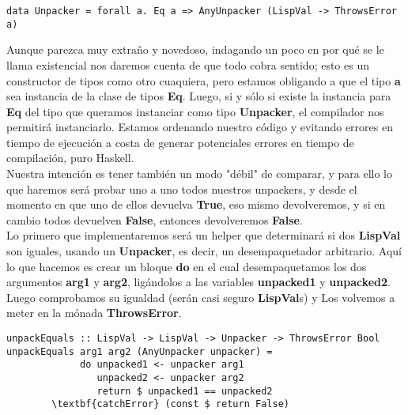\begin{minipage}{\linewidth}
\begin{scriptsize}
\begin{lstlisting}[frame=single]
data Unpacker = forall a. Eq a => AnyUnpacker (LispVal -> ThrowsError a)
\end{lstlisting}
\end{scriptsize}
\end{minipage}

Aunque parezca muy extra\~{n}o y novedoso, indagando un poco en por qu\'e se le llama existencial nos daremos cuenta de que todo cobra sentido; esto es un constructor de tipos como otro cuaquiera, pero estamos obligando a que el tipo \textbf{a} sea instancia de la clase de tipos \textbf{Eq}. Luego, si y s\'olo si existe la instancia para \textbf{Eq} del tipo que queramos instanciar como tipo \textbf{Unpacker}, el compilador nos permitir\'a instanciarlo. Estamos ordenando nuestro c\'odigo y evitando errores en tiempo de ejecuci\'on a costa de generar potenciales errores en tiempo de compilaci\'on, puro Haskell.\\

Nuestra intenci\'on es tener tambi\'en un modo "d\'ebil" de comparar, y para ello lo que haremos ser\'a probar uno a uno todos nuestros unpackers, y desde el momento en que uno de ellos devuelva \textbf{True}, eso mismo devolveremos, y si en cambio todos devuelven \textbf{False}, entonces devolveremos \textbf{False}.\\

Lo primero que implementaremos ser\'a un helper que determinar\'a si dos \textbf{LispVal} son iguales, usando un \textbf{Unpacker}, es decir, un desempaquetador arbitrario. Aqu\'i lo que hacemos es crear un bloque \textbf{do} en el cual desempaquetamos los dos argumentos \textbf{arg1} y \textbf{arg2}, lig\'andolos a las variables \textbf{unpacked1} y \textbf{unpacked2}. Luego comprobamos su igualdad (ser\'an casi seguro \textbf{LispVal}s) y Los volvemos a meter en la m\'onada \textbf{ThrowsError}.\\

\begin{minipage}{\linewidth}
\begin{footnotesize}
\begin{lstlisting}[frame=single]
unpackEquals :: LispVal -> LispVal -> Unpacker -> ThrowsError Bool
unpackEquals arg1 arg2 (AnyUnpacker unpacker) = 
             do unpacked1 <- unpacker arg1
                unpacked2 <- unpacker arg2
                return $ unpacked1 == unpacked2
        \textbf{catchError} (const $ return False)
\end{lstlisting}
\end{footnotesize}
\end{minipage}


